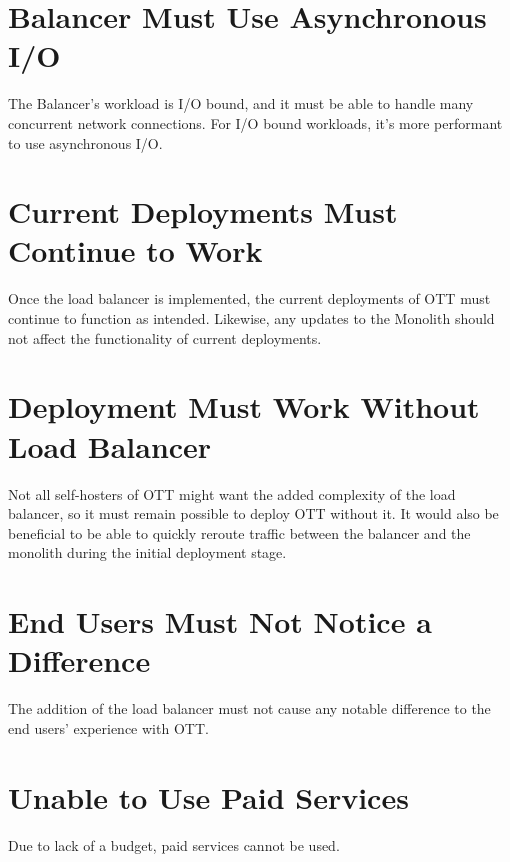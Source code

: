 \section{Balancer Must Use Asynchronous I/O   }

The Balancer's workload is I/O bound, and it must be able to handle many concurrent network connections. For I/O bound workloads, it's more performant to use asynchronous I/O\cite{async-vs-threads}.

\section{Current Deployments Must Continue to Work}

Once the load balancer is implemented, the current deployments of OTT must continue to function as intended. Likewise, any updates to the Monolith should not affect the functionality of current deployments.

\section{Deployment Must Work Without Load Balancer}

Not all self-hosters of OTT might want the added complexity of the load balancer, so it must remain possible to deploy OTT without it. It would also be beneficial to be able to quickly reroute traffic between the balancer and the monolith during the initial deployment stage.

\section{End Users Must Not Notice a Difference}

The addition of the load balancer must not cause any notable difference to the end users' experience with OTT.

\section{Unable to Use Paid Services}

Due to lack of a budget, paid services cannot be used.